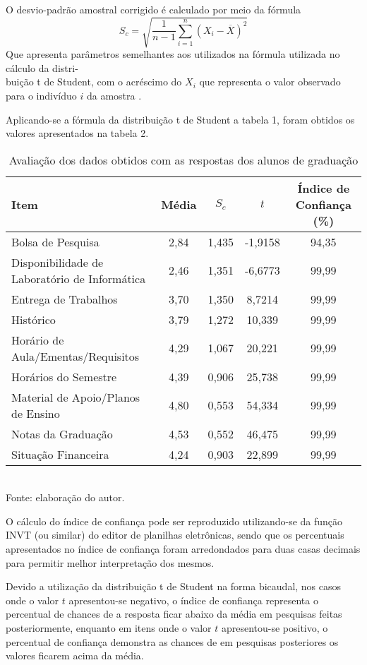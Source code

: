 O desvio-padrão amostral corrigido é calculado por meio da fórmula 
\[
   S_c = \sqrt{\frac{1}{n-1} \sum_{i=1}^n(X_i - \overline{X})^2} 
\]
Que apresenta parâmetros semelhantes aos utilizados na fórmula utilizada no cálculo da distri- \\ buição t de Student, com o acréscimo do $X_i$ que representa o valor observado para o indivíduo $i$ da amostra
\cite{DistroStudent}.

Aplicando-se a fórmula da distribuição t de Student a tabela 1, foram obtidos os valores apresentados na tabela 2.

\begin{table}[!hbt]
\centering
\caption[Avaliação dos dados obtidos - Graduação]{Avaliação dos dados obtidos com as respostas dos alunos de graduação}
\vspace{3mm}
\begin{tabular}{p{5cm}|c|c|c|c}\hline
\textbf{Item} & \textbf{Média} & \textbf{$S_c$} & \textbf{$t$} & \textbf{Índice de Confiança (\%)} \\ \hline
Bolsa de Pesquisa & 2,84 & 1,435 & -1,9158 & 94,35 \\ \hline
Disponibilidade de Laboratório de Informática & 2,46 & 1,351 & -6,6773 & 99,99 \\ \hline
Entrega de Trabalhos & 3,70 & 1,350 & 8,7214 & 99,99 \\ \hline
Histórico & 3,79 & 1,272 & 10,339 & 99,99 \\ \hline
Horário de Aula/Ementas/Requisitos & 4,29 & 1,067 & 20,221 & 99,99  \\ \hline
Horários do Semestre & 4,39 & 0,906 & 25,738 & 99,99 \\ \hline
Material de Apoio/Planos de Ensino & 4,80 & 0,553 & 54,334 & 99,99 \\ \hline
Notas da Graduação & 4,53 & 0,552 & 46,475 & 99,99 \\ \hline
Situação Financeira & 4,24 & 0,903 & 22,899 & 99,99 \\ \hline
\end{tabular}
\\ Fonte: elaboração do autor.
\end{table}

O cálculo do índice de confiança pode ser reproduzido utilizando-se da função INVT (ou similar) do editor de planilhas eletrônicas, sendo que os percentuais apresentados no índice de confiança foram arredondados para duas casas decimais para permitir melhor interpretação dos mesmos. 

Devido a utilização da  distribuição t de Student na forma bicaudal, nos casos onde o valor $t$ apresentou-se negativo, o índice de confiança representa o percentual de chances de a resposta ficar abaixo da média em pesquisas feitas posteriormente, enquanto em itens onde o valor $t$ apresentou-se positivo, o percentual de confiança demonstra as chances de em pesquisas posteriores os valores ficarem acima da média.

